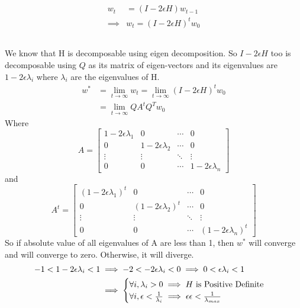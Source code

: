 \documentclass[]{article}
\numberwithin{equation}{section}
\newcommand{\transpose}{^T}
\begin{document}
\subsection{}
\begin{align}
w_t &= (I - 2\epsilon H) w_{t-1}\\
\implies & w_t = (I - 2\epsilon H)^t w_{0}
\end{align}

\subsection{}
We know that H is decomposable using eigen decomposition.
So \(I - 2\epsilon H\) too is decomposable using \(Q\) as its matrix of eigen-vectors and its eigenvalues are \(1 - 2\epsilon \lambda_i\) where \(\lambda_i\) are the eigenvalues of H.
\begin{align}
w^* &= \lim_{t\rightarrow \infty} w_t = \lim_{t\rightarrow \infty} (I - 2\epsilon H)^t w_{0}\\
&= \lim_{t\rightarrow \infty} Q A^t Q\transpose w_{0}
\end{align}
Where \[A = \begin{bmatrix} 1 - 2\epsilon \lambda_1 & 0 & \cdots & 0 \\ 0 & 1 - 2\epsilon \lambda_2 & \cdots & 0 \\ \vdots & \vdots & \ddots & \vdots \\ 0 & 0 & \cdots & 1 - 2\epsilon \lambda_n \end{bmatrix}\]
and \[A^t= \begin{bmatrix} (1 - 2\epsilon \lambda_1)^t & 0 & \cdots & 0 \\ 0 & (1 - 2\epsilon \lambda_2)^t & \cdots & 0 \\ \vdots & \vdots & \ddots & \vdots \\ 0 & 0 & \cdots & (1 - 2\epsilon \lambda_n)^t \end{bmatrix}\]
So if absolute value of all eigenvalues of A are less than 1, then \(w^*\) will converge and will converge to zero. Otherwise, it will diverge.
\begin{align}
-1 < 1 - 2\epsilon \lambda_i < 1 &\implies -2 < -2\epsilon \lambda_i < 0 \implies 0 < \epsilon \lambda_i < 1\\
 &\implies \begin{cases}
    \forall i, \lambda_i > 0 \implies H \textup{ is Positive Definite}\\
    \forall i, \epsilon < \frac{1}{\lambda_i} \implies \epsilon \epsilon < \frac{1}{\lambda_{max}}
 \end{cases}
\end{align}
\end{document}
